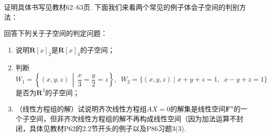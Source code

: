证明具体书写见教材62--63页. 下面我们来看两个常见的例子体会子空间的判别方法：
\begin{example}\label{ex:2:常见子空间}
    回答下列关于子空间的判定问题：
    \begin{enumerate}
        \item \label{item:2:常见子空间:1}
              说明$\mathbf{R}[x]_2$是$\mathbf{R}[x]_3$的子空间；

        \item \label{item:2:常见子空间:2}
              判断$W_1=\left\{(x,y,z) \,\middle|\, \dfrac{x}{3}=\dfrac{y}{2}=z\right\},\enspace W_2=\{(x,y,z) \mid x+y+z=1,\enspace x-y+z=1\}$是否为$\mathbf{R}^3$的子空间；

        \item \label{item:2:常见子空间:3}
              （线性方程组的解）试说明齐次线性方程组$AX=0$的解集是线性空间$\mathbf{F}^n$的一个子空间，但非齐次线性方程组的解不再构成线性空间（因为加法运算不封闭，具体见教材P62的2.2节开头的例子以及P86习题3(3).
    \end{enumerate}
\end{example}

